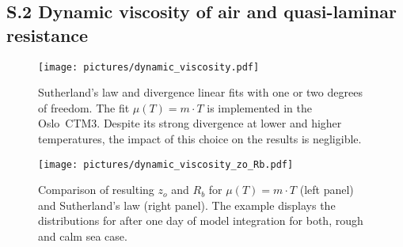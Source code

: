 \documentclass[manuscript]{copernicus}
\begin{document}
\subsection*{S.2 Dynamic viscosity of air and quasi-laminar resistance}
\begin{figure}[!htbp]
  \centering
  \texttt{[image: pictures/dynamic\_viscosity.pdf]}
  \caption{Sutherland's law and divergence linear fits with one or two degrees of freedom. The fit $\mu(T) = m\cdot T$ is implemented in the Oslo~CTM3. Despite its strong divergence at lower and higher temperatures, the impact of this choice on the results is negligible.}
\end{figure}
%
\begin{figure}[!htbp]
  \centering
  \texttt{[image: pictures/dynamic\_viscosity\_zo\_Rb.pdf]}
  \caption{Comparison of resulting $z_o$ and $R_b$ for $\mu(T) = m\cdot T$  (left panel) and Sutherland's law (right panel). The example displays the distributions for  after one day of model integration for both, rough and calm sea case.}
\end{figure}
\end{document}
